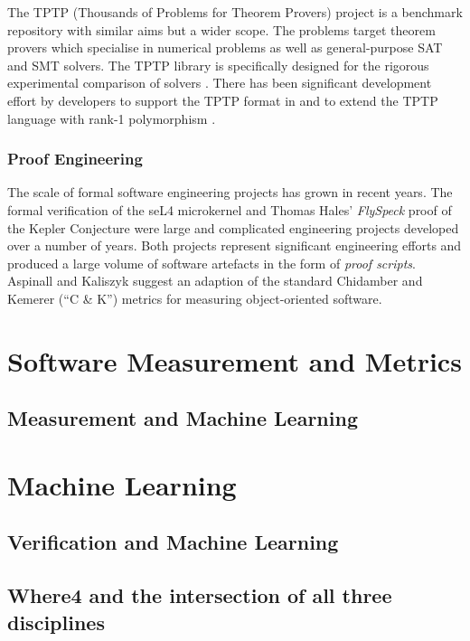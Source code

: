 The TPTP (Thousands of Problems for Theorem Provers) project \cite{TPTP} is a benchmark repository with similar aims but a wider scope. The problems target theorem provers which specialise in numerical problems as well as general-purpose SAT and SMT solvers. The TPTP library is specifically designed for the rigorous experimental comparison of solvers \cite{Sutcliffe200139}. There has been significant development effort by \why developers to support the TPTP format in \why and to extend the TPTP language with rank-1 polymorphism \cite{why:tptp}. 

\subsubsection{Proof Engineering}
\label{sub:lrsvmmpe}

The scale of formal software engineering projects has grown in recent years. The formal verification of the seL4 microkernel \cite{Klein:2014:CFV} and Thomas Hales' \textit{FlySpeck} proof of the Kepler Conjecture \cite{hales-kepler} were large and complicated engineering projects developed over a number of years. Both projects represent significant engineering efforts and produced a large volume of software artefacts in the form of \textit{proof scripts}. Aspinall and Kaliszyk \cite{Aspinall2016} suggest an adaption of the standard Chidamber and Kemerer (``C \& K'') metrics for measuring object-oriented software.     

\section{Software Measurement and Metrics}
\label{sec:lrmm}

\subsection{Measurement and Machine Learning}
\label{sub:lrmmml}

\section{Machine Learning}
\label{sec:lrml}

\subsection{Verification and Machine Learning}
\label{sub:lrsvml}

\subsection{Where4 and the intersection of all three disciplines}
\label{sub:lrsvmmml}
